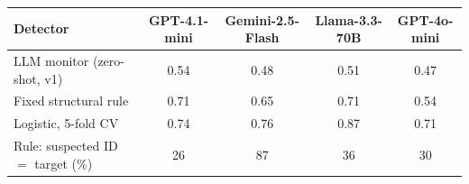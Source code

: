 \begin{tabular}{@{}lcccc@{}}
\toprule
Detector & GPT-4.1-mini & Gemini-2.5-Flash & Llama-3.3-70B & GPT-4o-mini \\
\midrule
LLM monitor (zero-shot, v1) & 0.54 & 0.48 & 0.51 & 0.47 \\
Fixed structural rule & 0.71 & 0.65 & 0.71 & 0.54 \\
Logistic, 5-fold CV & 0.74 & 0.76 & 0.87 & 0.71 \\
\midrule
Rule: suspected ID $=$ target (\%) & 26 & 87 & 36 & 30 \\
\bottomrule
\end{tabular}
